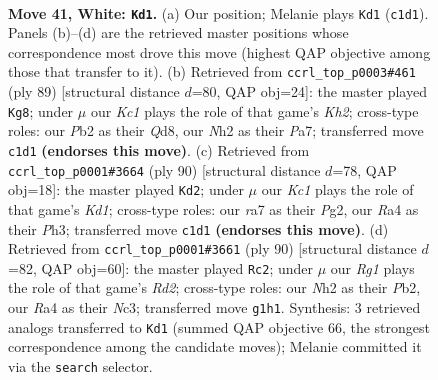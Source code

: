 \documentclass[11pt]{article}
\begin{document}
\clearpage

\begin{figure}[p]\centering
\begin{subfigure}{0.46\textwidth}\centering
\resizebox{\linewidth}{!}{%
\newchessgame
\chessboard[
  setfen={5b1r/rpk3p1/p1p4p/P2b1p2/R1p4P/2B1P1P1/1P3P1N/2K3R1 w - - 4 41},
  showmover=false,
  pgfstyle=straightmove, color=movearrow, markmove={c1-d1}
]}
\caption{}
\end{subfigure}\hfill
\begin{subfigure}{0.46\textwidth}\centering
\resizebox{\linewidth}{!}{%
\newchessgame
\chessboard[
  setfen={3q4/p2r2pk/1p1Pp2p/2p1Bp2/2P1bP2/4P2P/P2R2PK/3Q4 b - - 9 45},
  showmover=false,
  pgfstyle=straightmove, color=movearrow, markmove={h7-g8}
]}
\caption{}
\end{subfigure}
\\[4pt]
\begin{subfigure}{0.46\textwidth}\centering
\resizebox{\linewidth}{!}{%
\newchessgame
\chessboard[
  setfen={8/4k1p1/p1rp1p1p/1p2pP2/1B1bP3/PP1R3P/2P3P1/3K4 w - - 7 46},
  showmover=false,
  pgfstyle=straightmove, color=movearrow, markmove={d1-d2}
]}
\caption{}
\end{subfigure}\hfill
\begin{subfigure}{0.46\textwidth}\centering
\resizebox{\linewidth}{!}{%
\newchessgame
\chessboard[
  setfen={5b2/1b1r1pk1/pr4p1/3p3p/R2P3P/2N1PBP1/1P1R2K1/8 w - - 12 46},
  showmover=false,
  pgfstyle=straightmove, color=movearrow, markmove={d2-c2}
]}
\caption{}
\end{subfigure}
\caption{\textbf{Move 41, White: \texttt{Kd1}.} (a) Our position; Melanie plays \texttt{Kd1} (\texttt{c1d1}). Panels (b)--(d) are the retrieved master positions whose correspondence most drove this move (highest QAP objective among those that transfer to it). (b) Retrieved from \texttt{ccrl\_top\_p0003\#461} (ply 89) [structural distance $d$=80, QAP obj=24]: the master played \texttt{Kg8}; under $\mu$ our \emph{Kc1} plays the role of that game's \emph{Kh2}; cross-type roles: our \emph{P}b2 as their \emph{Q}d8, our \emph{N}h2 as their \emph{P}a7; transferred move \texttt{c1d1} \textbf{(endorses this move)}. (c) Retrieved from \texttt{ccrl\_top\_p0001\#3664} (ply 90) [structural distance $d$=78, QAP obj=18]: the master played \texttt{Kd2}; under $\mu$ our \emph{Kc1} plays the role of that game's \emph{Kd1}; cross-type roles: our \emph{r}a7 as their \emph{P}g2, our \emph{R}a4 as their \emph{P}h3; transferred move \texttt{c1d1} \textbf{(endorses this move)}. (d) Retrieved from \texttt{ccrl\_top\_p0001\#3661} (ply 90) [structural distance $d$=82, QAP obj=60]: the master played \texttt{Rc2}; under $\mu$ our \emph{Rg1} plays the role of that game's \emph{Rd2}; cross-type roles: our \emph{N}h2 as their \emph{P}b2, our \emph{R}a4 as their \emph{N}c3; transferred move \texttt{g1h1}. Synthesis: 3 retrieved analogs transferred to \texttt{Kd1} (summed QAP objective 66, the strongest correspondence among the candidate moves); Melanie committed it via the \texttt{search} selector.}
\label{fig:thought-m80}
\end{figure}
\end{document}
